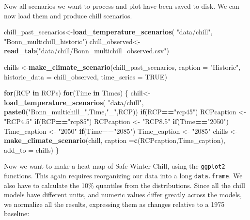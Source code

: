 \documentclass[
]{book}
\newenvironment{Shaded}{\begin{snugshade}}{\end{snugshade}}
\newcommand{\ControlFlowTok}[1]{\textcolor[rgb]{0.13,0.29,0.53}{\textbf{#1}}}
\newcommand{\DataTypeTok}[1]{\textcolor[rgb]{0.13,0.29,0.53}{#1}}
\newcommand{\KeywordTok}[1]{\textcolor[rgb]{0.13,0.29,0.53}{\textbf{#1}}}
\newcommand{\NormalTok}[1]{#1}
\newcommand{\OperatorTok}[1]{\textcolor[rgb]{0.81,0.36,0.00}{\textbf{#1}}}
\newcommand{\OtherTok}[1]{\textcolor[rgb]{0.56,0.35,0.01}{#1}}
\newcommand{\StringTok}[1]{\textcolor[rgb]{0.31,0.60,0.02}{#1}}
\begin{document}
Now all scenarios we want to process and plot have been saved to disk. We can now load them and produce chill scenarios.

\begin{Shaded}
\begin{Highlighting}[]
\NormalTok{chill_past_scenarios<-}\KeywordTok{load_temperature_scenarios}\NormalTok{(}
  \StringTok{"data/chill"}\NormalTok{,}
  \StringTok{"Bonn_multichill_historic"}\NormalTok{)}
\NormalTok{chill_observed<-}\KeywordTok{read_tab}\NormalTok{(}\StringTok{"data/chill/Bonn_multichill_observed.csv"}\NormalTok{)}

\NormalTok{chills <-}\KeywordTok{make_climate_scenario}\NormalTok{(chill_past_scenarios,}
                               \DataTypeTok{caption =} \StringTok{"Historic"}\NormalTok{,}
                               \DataTypeTok{historic_data =}\NormalTok{ chill_observed,}
                               \DataTypeTok{time_series =} \OtherTok{TRUE}\NormalTok{)}

\ControlFlowTok{for}\NormalTok{(RCP }\ControlFlowTok{in}\NormalTok{ RCPs)}
  \ControlFlowTok{for}\NormalTok{(Time }\ControlFlowTok{in}\NormalTok{ Times)}
\NormalTok{    \{}
\NormalTok{    chill<-}\KeywordTok{load_temperature_scenarios}\NormalTok{(}
      \StringTok{"data/chill"}\NormalTok{,}
      \KeywordTok{paste0}\NormalTok{(}\StringTok{"Bonn_multichill_"}\NormalTok{,Time,}\StringTok{"_"}\NormalTok{,RCP))}
    \ControlFlowTok{if}\NormalTok{(RCP}\OperatorTok{==}\StringTok{"rcp45"}\NormalTok{) RCPcaption <-}\StringTok{ "RCP4.5"}
    \ControlFlowTok{if}\NormalTok{(RCP}\OperatorTok{==}\StringTok{"rcp85"}\NormalTok{) RCPcaption <-}\StringTok{ "RCP8.5"}
    \ControlFlowTok{if}\NormalTok{(Time}\OperatorTok{==}\StringTok{"2050"}\NormalTok{) Time_caption <-}\StringTok{ "2050"}
    \ControlFlowTok{if}\NormalTok{(Time}\OperatorTok{==}\StringTok{"2085"}\NormalTok{) Time_caption <-}\StringTok{ "2085"}
\NormalTok{    chills <-}\KeywordTok{make_climate_scenario}\NormalTok{(chill,}
                                   \DataTypeTok{caption =}\KeywordTok{c}\NormalTok{(RCPcaption,Time_caption),}
                                   \DataTypeTok{add_to =}\NormalTok{ chills)}
\NormalTok{\}}
\end{Highlighting}
\end{Shaded}

Now we want to make a heat map of Safe Winter Chill, using the \texttt{ggplot2} functions. This again requires reorganizing our data into a long \texttt{data.frame}. We also have to calculate the 10\% quantiles from the distributions. Since all the chill models have different units, and numeric values differ greatly across the models, we normalize all the results, expressing them as changes relative to a 1975 baseline:
\end{document}
